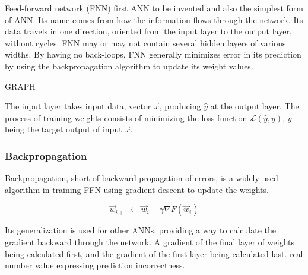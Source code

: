 {\color{red}Feed-forward network (FNN) first ANN to be invented and also the simplest form of ANN. Its name comes from how the information flows through the network. Its data travels in one direction, oriented from the input layer to the output layer, without cycles.\cite{ffnbrilliant} 
}
FNN may or may not contain several hidden layers of various widths. By having no back-loops, FNN generally minimizes error in its prediction by using the backpropagation algorithm to update its weight values.\cite{mainTypesANN}

GRAPH

The input layer takes input data, vector $\vec{x}$, producing $\hat{y}$ at the output layer. The process of training weights
 consists of minimizing the loss function $\mathcal{L}(\hat{y},y)$, $y$ being the target output of input $\vec{x}$.\cite{lipton2015critical}

\subsubsection{Backpropagation}
Backpropagation, short of backward propagation of errors, is a widely used algorithm in training FFN using gradient descent to update the weights. \cite{birlliantbackprop}

\begin{equation}
    {\vec{w}_{i+1} \leftarrow \vec{w}_i - \gamma \nabla F(\vec{w}_i)}
\end{equation}

{\color{red}
Its generalization is used for other ANNs, providing a way to calculate the gradient backward through the network. A gradient of the final layer of weights being calculated first, and the gradient of the first layer being calculated last. \cite{birlliantbackprop}
}
real number value expressing prediction incorrectness.\cite{Goodfellow-et-al-2016}
